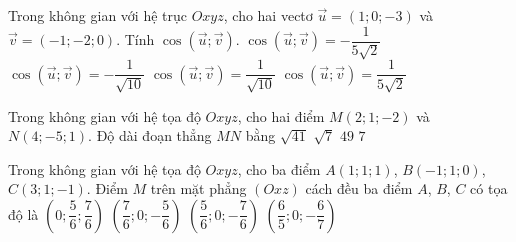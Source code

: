 \begin{ex}%
	Trong không gian với hệ trục $Oxyz$, cho hai vectơ $\overrightarrow{u}=(1;0;-3)$ và $\overrightarrow{v}=(-1;-2;0)$. Tính $\cos\left( \overrightarrow{u};\overrightarrow{v}\right) $.
	\choice
	{\True $\cos\left( \overrightarrow{u};\overrightarrow{v}\right) =-\dfrac{1}{5\sqrt{2}}$}
	{$\cos\left( \overrightarrow{u};\overrightarrow{v}\right) =-\dfrac{1}{\sqrt{10}}$}
	{$\cos\left( \overrightarrow{u};\overrightarrow{v}\right) =\dfrac{1}{\sqrt{10}}$}
	{$\cos\left( \overrightarrow{u};\overrightarrow{v}\right) =\dfrac{1}{5\sqrt{2}}$}
\end{ex}
\begin{ex}%
	Trong không gian với hệ tọa độ $Oxyz$, cho hai điểm $M(2;1;-2)$ và $N(4;-5;1)$. Độ dài đoạn thẳng $MN$ bằng
	\choice
	{$\sqrt{41}$}
	{$\sqrt{7}$}
	{$49$}
	{\True $7$}
\end{ex}
\begin{ex}%
	Trong không gian với hệ tọa độ $Oxyz$, cho ba điểm $A(1;1;1 )$, $B(-1;1;0 )$, $C(3;1;-1 )$. Điểm $M$ trên mặt phẳng $(Oxz )$ cách đều ba điểm $A$, $B$, $C$ có tọa độ là
	\choice 
	{ $\left(0;\dfrac{5}{6};\dfrac{7}{6} \right)$}
	{ $\left(\dfrac{7}{6};0;-\dfrac{5}{6} \right)$}
	{ \True $\left(\dfrac{5}{6};0;-\dfrac{7}{6} \right)$}
	{ $\left(\dfrac{6}{5};0;-\dfrac{6}{7} \right)$} 
\end{ex}
